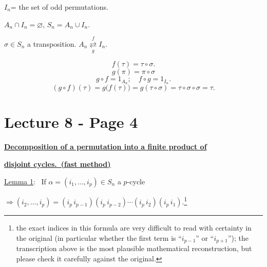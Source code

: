 \bigskip
\noindent $I_n$= the set of odd permutations.

\noindent $A_n\cap I_n=\varnothing$, \quad $S_n = A_n\cup I_n$.

\bigskip
\noindent $\sigma\in S_n$ a transposition. \qquad $A_n \underset{g}{\overset{f}{\rightleftarrows}} I_n$.

\[
f(\tau) = \tau\circ\sigma.
\]
\[
g(\pi) = \pi\circ\sigma
\]
\[
g\circ f = 1_{A_n}; \quad f\circ g = 1_{I_n}.
\]
\[
(g\circ f)(\tau) = g\big(f(\tau)\big) = g(\tau\circ\sigma) = \tau\circ\sigma\circ\sigma = \tau.
\]



\section*{Lecture 8 - Page 4}

\noindent\underline{\textbf{Decomposition of a permutation into a finite product of}}

\noindent\underline{\textbf{disjoint cycles.\ (fast method)}}

\bigskip
\bigskip
\noindent\underline{Lemma 1}: \ If $\alpha = (i_1,\ldots,i_p)\in S_n$ \quad a $p$-cycle

\bigskip
\noindent $\Rightarrow (i_2,\ldots,i_p) = (i_p\,i_{p-1})(i_p\,i_{p-2})\cdots(i_p\,i_2)(i_p\,i_1).$\footnote{the exact indices in this formula are very difficult to read with certainty in the original (in particular whether the first term is ``$i_{p-1}$'' or ``$i_{p+1}$''); the transcription above is the most plausible mathematical reconstruction, but please check it carefully against the original.}